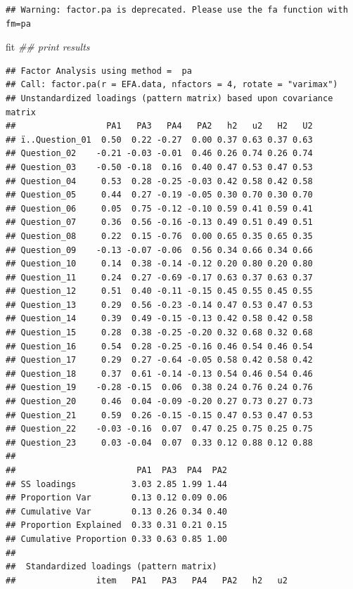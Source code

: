 \documentclass[
]{book}
\newenvironment{Shaded}{\begin{snugshade}}{\end{snugshade}}
\newcommand{\CommentTok}[1]{\textcolor[rgb]{0.56,0.35,0.01}{\textit{#1}}}
\newcommand{\NormalTok}[1]{#1}
\begin{document}
\begin{verbatim}
## Warning: factor.pa is deprecated. Please use the fa function with fm=pa
\end{verbatim}

\begin{Shaded}
\begin{Highlighting}[]
\NormalTok{fit }\CommentTok{## print results}
\end{Highlighting}
\end{Shaded}

\begin{verbatim}
## Factor Analysis using method =  pa
## Call: factor.pa(r = EFA.data, nfactors = 4, rotate = "varimax")
## Unstandardized loadings (pattern matrix) based upon covariance matrix
##                  PA1   PA3   PA4   PA2   h2   u2   H2   U2
## ï..Question_01  0.50  0.22 -0.27  0.00 0.37 0.63 0.37 0.63
## Question_02    -0.21 -0.03 -0.01  0.46 0.26 0.74 0.26 0.74
## Question_03    -0.50 -0.18  0.16  0.40 0.47 0.53 0.47 0.53
## Question_04     0.53  0.28 -0.25 -0.03 0.42 0.58 0.42 0.58
## Question_05     0.44  0.27 -0.19 -0.05 0.30 0.70 0.30 0.70
## Question_06     0.05  0.75 -0.12 -0.10 0.59 0.41 0.59 0.41
## Question_07     0.36  0.56 -0.16 -0.13 0.49 0.51 0.49 0.51
## Question_08     0.22  0.15 -0.76  0.00 0.65 0.35 0.65 0.35
## Question_09    -0.13 -0.07 -0.06  0.56 0.34 0.66 0.34 0.66
## Question_10     0.14  0.38 -0.14 -0.12 0.20 0.80 0.20 0.80
## Question_11     0.24  0.27 -0.69 -0.17 0.63 0.37 0.63 0.37
## Question_12     0.51  0.40 -0.11 -0.15 0.45 0.55 0.45 0.55
## Question_13     0.29  0.56 -0.23 -0.14 0.47 0.53 0.47 0.53
## Question_14     0.39  0.49 -0.15 -0.13 0.42 0.58 0.42 0.58
## Question_15     0.28  0.38 -0.25 -0.20 0.32 0.68 0.32 0.68
## Question_16     0.54  0.28 -0.25 -0.16 0.46 0.54 0.46 0.54
## Question_17     0.29  0.27 -0.64 -0.05 0.58 0.42 0.58 0.42
## Question_18     0.37  0.61 -0.14 -0.13 0.54 0.46 0.54 0.46
## Question_19    -0.28 -0.15  0.06  0.38 0.24 0.76 0.24 0.76
## Question_20     0.46  0.04 -0.09 -0.20 0.27 0.73 0.27 0.73
## Question_21     0.59  0.26 -0.15 -0.15 0.47 0.53 0.47 0.53
## Question_22    -0.03 -0.16  0.07  0.47 0.25 0.75 0.25 0.75
## Question_23     0.03 -0.04  0.07  0.33 0.12 0.88 0.12 0.88
## 
##                        PA1  PA3  PA4  PA2
## SS loadings           3.03 2.85 1.99 1.44
## Proportion Var        0.13 0.12 0.09 0.06
## Cumulative Var        0.13 0.26 0.34 0.40
## Proportion Explained  0.33 0.31 0.21 0.15
## Cumulative Proportion 0.33 0.63 0.85 1.00
## 
##  Standardized loadings (pattern matrix)
##                item   PA1   PA3   PA4   PA2   h2   u2

\end{verbatim}
\end{document}
